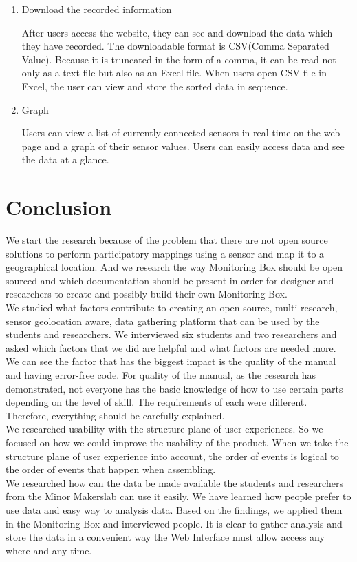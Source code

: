 \documentclass[conference]{IEEEtran}
\begin{document}
\begin{enumerate}
\begin{enumerate}
\begin{enumerate}
				\item Download the recorded information

					After users access the website, they can see and download the data which they have recorded. The downloadable format is CSV(Comma Separated Value). Because it is truncated in the form of a comma, it can be read not only as a text file but also as an Excel file. When users open CSV file in Excel, the user can view and store the sorted data in sequence.\\

				\item Graph

					Users can view a list of currently connected sensors in real time on the web page and a graph of their sensor values. Users can easily access data and see the data at a glance.\\
			\end{enumerate}
		\end{enumerate}
 	\end{enumerate}
\section{Conclusion}
	We start the research because of the problem that there are not open source solutions to perform participatory mappings using a sensor and map it to a geographical location. And we research the way Monitoring Box should be open sourced and which documentation should be present in order for designer and researchers to create and possibly build their own Monitoring Box. \\
	We studied what factors contribute to creating an open source, multi-research, sensor geolocation aware, data gathering platform that can be used by the students and researchers. We interviewed six students and two researchers and asked which factors that we did are helpful and what factors are needed more. We can see the factor that has the biggest impact is the quality of the manual and having error-free code. For quality of the manual, as the research has demonstrated, not everyone has the basic knowledge of how to use certain parts depending on the level of skill. The requirements of each were different. Therefore, everything should be carefully explained. \\
	We researched usability with the structure plane of user experiences. So we focused on how we could improve the usability of the product. When we take the structure plane of user experience into account, the order of events is logical to the order of events that happen when assembling. \\
	We researched how can the data be made available the students and researchers from the Minor Makerslab can use it easily. We have learned how people prefer to use data and easy way to analysis data. Based on the findings, we applied them in the Monitoring Box and interviewed people. It is clear to gather analysis and store the data in a convenient way the Web Interface must allow access any where and any time.\\
\end{document}
